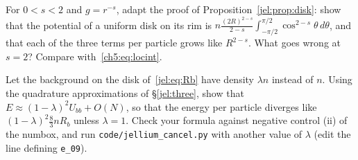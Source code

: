 \begin{exercise}\label{jel:ex:riesz}
For $0<s<2$ and $g=r^{-s}$, adapt the proof of Proposition~\ref{jel:prop:disk}: show that the potential of a uniform
disk on its rim is $n\frac{(2R)^{2-s}}{2-s}\int_{-\pi/2}^{\pi/2}\cos^{2-s}\theta\,d\theta$, and that each
of the three terms per particle grows like $R^{2-s}$. What goes wrong at $s=2$? Compare with~\eqref{ch5:eq:locint}.
\end{exercise}

\begin{exercise}\label{jel:ex:mismatch}
Let the background on the disk of~\eqref{jel:eq:Rb} have density $\lambda n$ instead of $n$. Using the quadrature
approximations of \S\ref{jel:three}, show that $E\approx(1-\lambda)^2U_{bb}+O(N)$, so that the energy per particle
diverges like $(1-\lambda)^2\frac83nR_b$ unless $\lambda=1$. Check your formula against negative control (ii) of the
numbox, and run \texttt{code/jellium\_cancel.py} with another value of $\lambda$ (edit the line defining \texttt{e\_09}).
\end{exercise}
